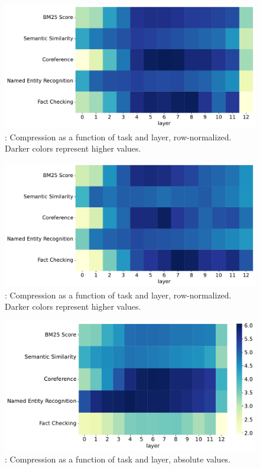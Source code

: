 \begin{figure}
    \includegraphics[width=\textwidth]{gfx/probing/heatmap_compression_passage}
    \caption{: Compression as a function of task and layer, row-normalized. Darker colors represent higher values.}
    \label{fig:heatmap_comp_passage}
\end{figure}

\begin{figure}
    \includegraphics[width=\textwidth]{gfx/probing/heatmap_compression_base}
    \caption{: Compression as a function of task and layer, row-normalized. Darker colors represent higher values.}
    \label{fig:heatmap_comp_base}
\end{figure}


\begin{figure}
    \centering
    \includegraphics[width=\textwidth]{gfx/probing/abs_heatmap_compression_passage}
    \caption{: Compression as a function of task and layer, absolute values.}
\end{figure}


